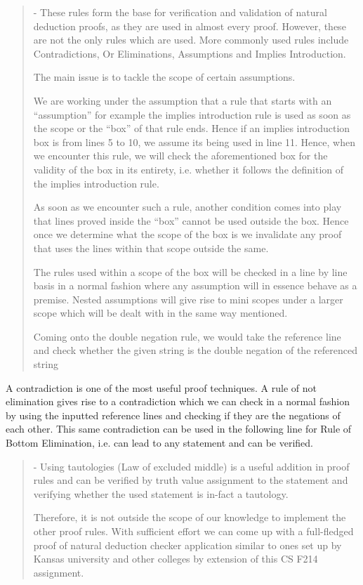 \begin{quote}
-\/ These rules form the base for verification and validation of natural deduction proofs, as they are used in almost every proof. However, these are not the only rules which are used. More commonly used rules include Contradictions, Or Eliminations, Assumptions and Implies Introduction.
\begin{DoxyItemize}
\item The main issue is to tackle the scope of certain assumptions.
\item We are working under the assumption that a rule that starts with an “assumption” for example the implies introduction rule is used as soon as the scope or the “box” of that rule ends. Hence if an implies introduction box is from lines 5 to 10, we assume its being used in line 11. Hence, when we encounter this rule, we will check the aforementioned box for the validity of the box in its entirety, i.\+e. whether it follows the definition of the implies introduction rule.
\item As soon as we encounter such a rule, another condition comes into play that lines proved inside the “box” cannot be used outside the box. Hence once we determine what the scope of the box is we invalidate any proof that uses the lines within that scope outside the same.
\item The rules used within a scope of the box will be checked in a line by line basis in a normal fashion where any assumption will in essence behave as a premise. Nested assumptions will give rise to mini scopes under a larger scope which will be dealt with in the same way mentioned.
\item Coming onto the double negation rule, we would take the reference line and check whether the given string is the double negation of the referenced string 
\end{DoxyItemize}\end{quote}
A contradiction is one of the most useful proof techniques. A rule of not elimination gives rise to a contradiction which we can check in a normal fashion by using the inputted reference lines and checking if they are the negations of each other. This same contradiction can be used in the following line for Rule of Bottom Elimination, i.\+e. can lead to any statement and can be verified. \begin{quote}
-\/ Using tautologies (Law of excluded middle) is a useful addition in proof rules and can be verified by truth value assignment to the statement and verifying whether the used statement is in-\/fact a tautology.
\begin{DoxyItemize}
\item Therefore, it is not outside the scope of our knowledge to implement the other proof rules. With sufficient effort we can come up with a full-\/fledged proof of natural deduction checker application similar to ones set up by Kansas university and other colleges by extension of this CS F214 assignment. ~\newline
~\newline
 
\end{DoxyItemize}\end{quote}
